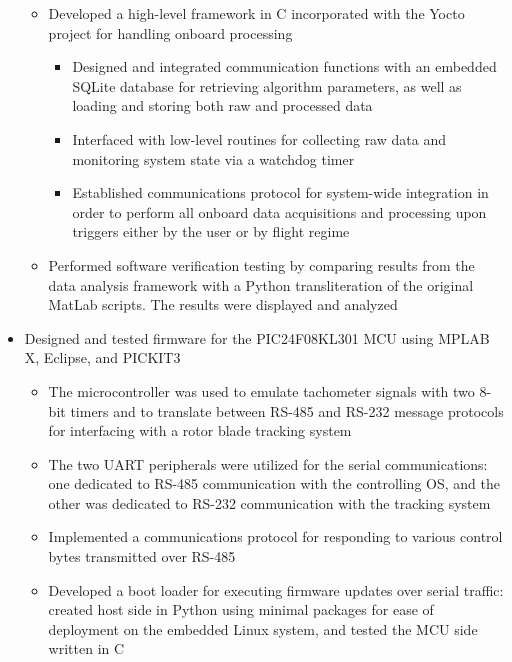 \documentclass[10pt,a4paper]{article}
\begin{document}
\begin{itemize}
\begin{itemize}
      \item Developed a high-level framework in C incorporated with the Yocto project
        for handling onboard processing
        \begin{itemize}
          \item Designed and integrated communication functions with an embedded SQLite
            database for retrieving algorithm parameters, as well as loading and storing
            both raw and processed data

          \item Interfaced with low-level routines for collecting raw data and
            monitoring system state via a watchdog timer

          \item Established communications protocol for system-wide integration in order
            to perform all onboard data acquisitions and processing upon triggers either
            by the user or by flight regime
        \end{itemize}

      \item Performed software verification testing by comparing results from the data
        analysis framework with a Python transliteration of the original MatLab scripts.
        The results were displayed and analyzed
    \end{itemize}

  \item Designed and tested firmware for the PIC24F08KL301 MCU using MPLAB X, Eclipse,
    and PICKIT3
    \begin{itemize}
      \item The microcontroller was used to emulate tachometer signals with two 8-bit
        timers and to translate between RS-485 and RS-232 message protocols for
        interfacing with a rotor blade tracking system

      \item The two UART peripherals were utilized for the serial communications: one
        dedicated to RS-485 communication with the controlling OS, and the other was
        dedicated to RS-232 communication with the tracking system

      \item Implemented a communications protocol for responding to various control
        bytes transmitted over RS-485

      \item Developed a boot loader for executing firmware updates over serial traffic:
        created host side in Python using minimal packages for ease of deployment on the
        embedded Linux system, and tested the MCU side written in C


\end{itemize}
\end{itemize}
\end{document}
